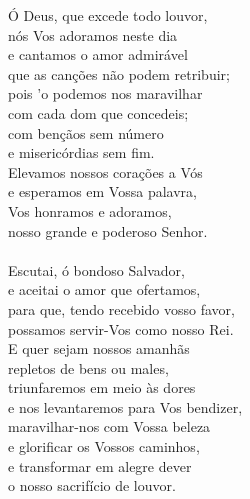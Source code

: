 \documentclass[10pt,a5]{article}
\begin{document}
\begin{paracol}{2}
\switchcolumn

\'O Deus, que excede todo louvor,\\
n\'os Vos adoramos neste dia\\
e cantamos o amor admir\'avel \\
que as can\c{c}\~oes n\~ao podem retribuir;\\
pois 'o podemos nos maravilhar \\
com cada dom que concedeis;\\
com ben\c{c}\~aos sem n\'umero \\
e miseric\'ordias sem fim.\\
Elevamos nossos cora\c{c}\~oes a V\'os\\
e esperamos em Vossa palavra,\\
Vos honramos e adoramos,\\
nosso grande e poderoso Senhor.\\
\\
Escutai, \'o bondoso Salvador, \\
e aceitai o amor que ofertamos,\\
para que, tendo recebido vosso favor,\\
possamos servir-Vos como nosso Rei.\\
E quer sejam nossos amanh\~as \\
repletos de bens ou males,\\
triunfaremos em meio \`as dores \\
e nos levantaremos para Vos bendizer,\\
maravilhar-nos com Vossa beleza \\
e glorificar os Vossos caminhos,\\
e transformar em alegre dever \\
o nosso sacrif\'icio de louvor.\\

\switchcolumn*

\end{paracol}


%
\end{document}
